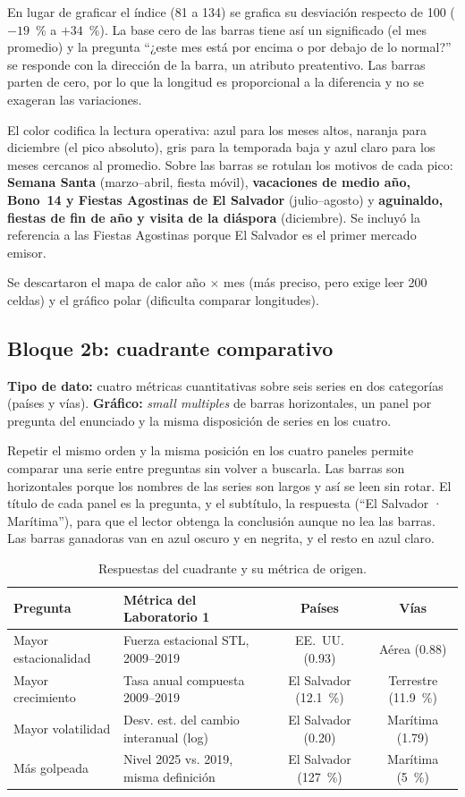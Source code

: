 \documentclass[12pt,letterpaper]{article}
\begin{document}
En lugar de graficar el índice (81 a 134) se grafica su desviación respecto de 100 ($-19$~\% a
$+34$~\%). La base cero de las barras tiene así un significado (el mes promedio) y la pregunta
``¿este mes está por encima o por debajo de lo normal?'' se responde con la dirección de la
barra, un atributo preatentivo. Las barras parten de cero, por lo que la longitud es
proporcional a la diferencia y no se exageran las variaciones.

El color codifica la lectura operativa: azul para los meses altos, naranja para diciembre (el
pico absoluto), gris para la temporada baja y azul claro para los meses cercanos al promedio. Sobre
las barras se rotulan los motivos de cada pico: \textbf{Semana Santa} (marzo--abril, fiesta
móvil), \textbf{vacaciones de medio año, Bono~14 y Fiestas Agostinas de El Salvador}
(julio--agosto) y \textbf{aguinaldo, fiestas de fin de año y visita de la diáspora} (diciembre).
Se incluyó la referencia a las Fiestas Agostinas porque El Salvador es el primer mercado emisor.

Se descartaron el mapa de calor año $\times$ mes (más preciso, pero exige leer 200 celdas) y el
gráfico polar (dificulta comparar longitudes).

\subsection{Bloque 2b: cuadrante comparativo}

\textbf{Tipo de dato:} cuatro métricas cuantitativas sobre seis series en dos categorías (países
y vías). \textbf{Gráfico:} \textit{small multiples} de barras horizontales, un panel por
pregunta del enunciado y la misma disposición de series en los cuatro.

Repetir el mismo orden y la misma posición en los cuatro paneles permite comparar una serie
entre preguntas sin volver a buscarla. Las barras son horizontales porque los nombres de las
series son largos y así se leen sin rotar. El título de cada panel es la pregunta, y el
subtítulo, la respuesta (``El Salvador · Marítima''), para que el lector obtenga la conclusión
aunque no lea las barras. Las barras ganadoras van en azul oscuro y en negrita, y el resto en azul
claro.

\begin{table}[H]
\centering
\small
\begin{tabularx}{\textwidth}{lXcc}
\toprule
\textbf{Pregunta} & \textbf{Métrica del Laboratorio 1} & \textbf{Países} & \textbf{Vías} \\
\midrule
Mayor estacionalidad & Fuerza estacional STL, 2009--2019 & EE.~UU. (0.93) & Aérea (0.88) \\
Mayor crecimiento & Tasa anual compuesta 2009--2019 & El Salvador (12.1~\%) & Terrestre (11.9~\%) \\
Mayor volatilidad & Desv. est. del cambio interanual (log) & El Salvador (0.20) & Marítima (1.79) \\
Más golpeada & Nivel 2025 vs. 2019, misma definición & El Salvador (127~\%) & Marítima (5~\%) \\
\bottomrule
\end{tabularx}
\caption{Respuestas del cuadrante y su métrica de origen.}
\end{table}
\end{document}
